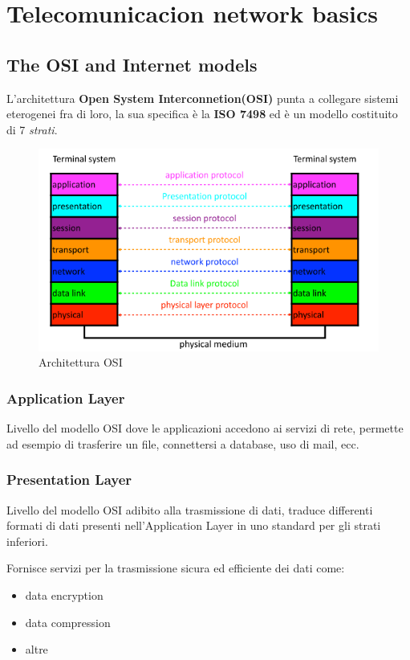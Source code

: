 
\chapter{Telecomunicacion network basics}
\section{The OSI and Internet models}

L'architettura \textbf{Open System Interconnetion(OSI)} punta a collegare sistemi
eterogenei fra di loro, la sua specifica è la \textbf{ISO 7498} ed è un modello
costituito di 7 \textit{strati}.

\begin{figure}[!ht]
	\centering
	\includegraphics[width=0.4\columnwidth]{./images/osi.png}
	\caption{Architettura OSI}
	\label{fig:osi}
\end{figure}

\subsection{Application Layer}
Livello del modello OSI dove le applicazioni accedono ai servizi di rete, permette ad esempio
di trasferire un file, connettersi a database, uso di mail, ecc.

\subsection{Presentation Layer}
Livello del modello OSI adibito alla trasmissione di dati, traduce differenti formati di dati 
presenti nell'Application Layer in uno standard per gli strati inferiori.

Fornisce servizi per la trasmissione sicura ed efficiente dei dati come:
\begin{itemize}
  \item data encryption
  \item data compression
  \item altre
\end{itemize}

